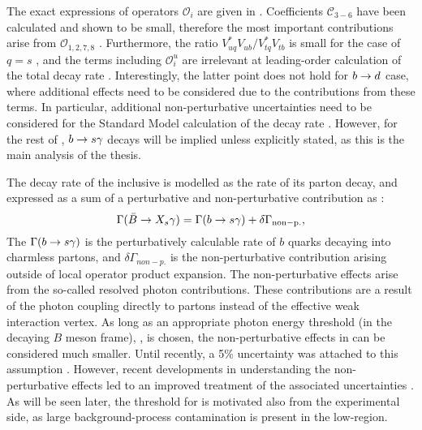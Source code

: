 The exact expressions of operators $\mathcal{O}_i$ are given in . 
Coefficients $\mathcal{C}_{3-6}$ have been calculated and shown to be small, therefore the most important contributions arise from $\mathcal{O}_{1,2,7,8}$ \cite{Chetyrkin:1996vx,Misiak:2020vlo}.
Furthermore, the ratio $V^*_{uq}V_{ub}/V^*_{tq}V_{tb}$ is small for the case of $q=s$ \cite{Charles:2015gya}, and the terms including $\mathcal{O}^u_i$ are irrelevant at leading-order calculation of the total decay rate \cite{Misiak:2015xwa}.
Interestingly, the latter point does not hold for $b\rightarrow d$ case, where additional effects need to be considered due to the contributions from these terms.
In particular, additional non-perturbative uncertainties need to be considered for the Standard Model calculation of the decay rate \cite{Misiak:2015xwa}.
However, for the rest of , $b\rightarrow s\gamma$ decays will be implied unless explicitly stated, as this is the main analysis of the thesis.

The decay rate of the inclusive \BtoXsgamma is modelled as the rate of its parton decay, and expressed as a sum of a perturbative and non-perturbative contribution as \cite{Misiak:2015xwa}:
\begin{equation}\label{eq:btosgammarate_nonp}
    \Gamma(\bar{B}\rightarrow X_s\gamma) = \Gamma(b\rightarrow s\gamma) + \delta\Gamma_{\mathrm{non-p.}},
\end{equation}
The $\Gamma(b\rightarrow s\gamma)$ is the perturbatively calculable rate of $b$ quarks decaying into charmless partons, and $\delta\Gamma_{non-p.}$ is the non-perturbative contribution arising outside of local operator product expansion.
The non-perturbative effects arise from the so-called resolved photon contributions.
These contributions are a result of the photon coupling directly to partons instead of the effective weak interaction vertex.
As long as an appropriate photon energy threshold (in the decaying $B$ meson frame), \EB, is chosen, the non-perturbative effects in  can be considered much smaller.
Until recently, a 5\% uncertainty was attached to this assumption \cite{Benzke:2010js}. 
However, recent developments in understanding the non-perturbative effects \cite{Gunawardana:2019gep} led to an improved treatment of the associated uncertainties \cite{Misiak:2020vlo}.
As will be seen later, the threshold for \EB is motivated also from the experimental side, as large background-process contamination is present in the low-\EB region.


